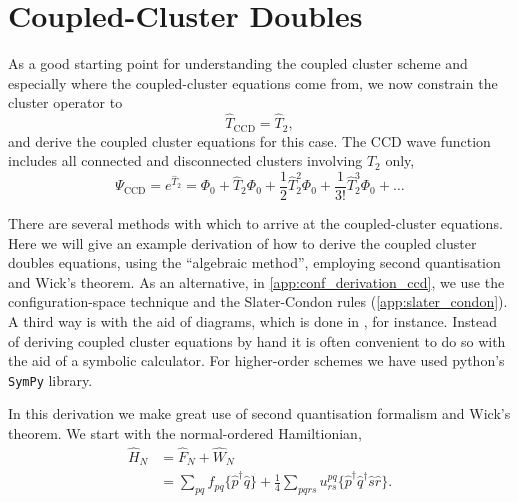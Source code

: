 \section{Coupled-Cluster Doubles}

As a good starting point for understanding the coupled cluster scheme and especially
where the coupled-cluster equations come from, we now constrain the cluster
operator to
\begin{equation}
    \hat{T}_{\text{CCD}} = \hat{T}_2,
\end{equation}
and derive the coupled cluster equations for this case.
The CCD wave function includes all connected and disconnected clusters involving
$\hat{T}_2$ only,
\begin{equation}
    \Psi_{\text{CCD}} = e^{\hat{T}_2} = \Phi_0 + \hat{T}_2\Phi_0 + \frac{1}{2}\hat{T}_2^2\Phi_0 
        + \frac{1}{3!}\hat{T}_2^3\Phi_0 + \dots
\end{equation}

There are several methods with which to arrive at the coupled-cluster equations. 
Here we will give an example derivation of how to derive the coupled cluster doubles
equations, using the ``algebraic method'',
employing second quantisation and Wick's theorem. As an alternative,
in \autoref{app:conf_derivation_ccd}, we use the
configuration-space technique and the Slater-Condon rules (\autoref{app:slater_condon}).
A third way is with the aid of
diagrams, which is done in \citeauthor{shavitt2009many} \cite{shavitt2009many}, for instance.
Instead of deriving coupled cluster equations by hand it is often convenient to 
do so with the aid of a symbolic calculator. For higher-order schemes we have used python's 
\lstinline{SymPy} library.

In this derivation we make great use of second quantisation formalism and Wick's 
theorem. We start with the normal-ordered Hamiltionian,
\begin{equation}
    \begin{aligned}
    \hat{H}_N &= \hat{F}_N  + \hat{W}_N \\
        &= \sum_{pq} f_{pq} \{ \hat{p}^\dagger \hat{q} \}
            + \frac{1}{4} \sum_{pqrs} u^{pq}_{rs} \{\hat{p}^\dagger\hat{q}^\dagger\hat{s}\hat{r}\}.
    \end{aligned}
\end{equation}

